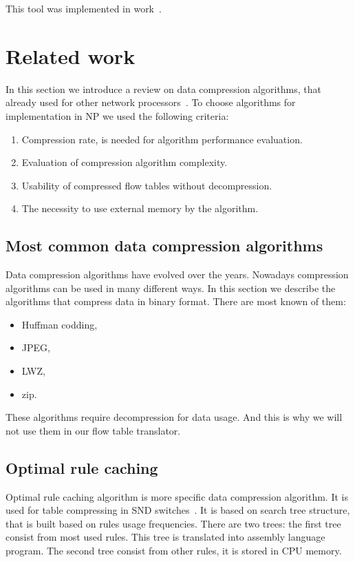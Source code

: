 \documentclass[conference]{IEEEtran}
\begin{document}
            This tool was implemented in work~\cite{andrewmonetec}.

    \section{Related work}
        In this section we  introduce a review on data compression algorithms, that already used
        for other network processors~\cite{braun2014wildcard}. 
        To choose algorithms for implementation in NP we used the following criteria:
        \begin{enumerate}
            \item Compression rate, is needed for algorithm performance evaluation.
            \item Evaluation of compression algorithm complexity.
            \item Usability of compressed flow tables without decompression.
            \item The necessity to use external memory by the algorithm.
        \end{enumerate}

        \subsection{Most common data compression algorithms}
            Data compression algorithms have evolved over the years. Nowadays compression 
            algorithms can be used in many different ways. In this section we describe
            the algorithms that compress data in binary format.
            There are most known of them:
            
            \begin{itemize}
                \item Huffman codding,
                \item JPEG,
                \item LWZ,
                \item zip.
            \end{itemize}
  
            These algorithms require decompression for data usage. And this is why
            we will not use them in our flow table translator.
        
        \subsection{Optimal rule caching}
            Optimal rule caching algorithm is more specific data compression algorithm. 
            It is used for table compressing in SND switches~\cite{rottenstreich2016optimal}.
            It is based on search tree structure, that is built based on rules usage frequencies.
            There are two trees: the first tree consist from most used rules. This tree is translated into assembly
            language program. The second tree consist from other rules, it is stored in CPU memory.
        
\end{document}
